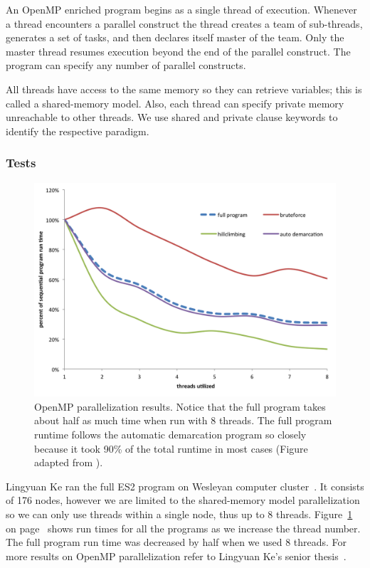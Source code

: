 An OpenMP enriched program begins as a single thread of execution.
Whenever a thread encounters a parallel construct the thread creates a team of sub-threads, generates a set of tasks, and then declares itself master of the team.
Only the master thread resumes execution beyond the end of the parallel construct.
The program can specify any number of parallel constructs.

All threads have access to the same memory so they can retrieve variables; this is called a shared-memory model.
Also, each thread can specify private memory unreachable to other threads.
We use shared and private clause keywords to identify the respective paradigm.

\subsubsection*{Tests}
\begin{figure}[h!]
\centering
\includegraphics[scale=0.6]{images/LingParallelized-CH4}
\caption[OpenMP parallelization results.]{OpenMP parallelization results. Notice that the full program takes about half as much time when run with 8 threads. The full program runtime follows the automatic demarcation program so closely because it took 90\% of the total runtime in most cases (Figure adapted from \protect\cite{lingThesis}).}
\label{fig:LingParallelized}
\end{figure}

Lingyuan Ke ran the full ES2 program on Wesleyan computer cluster~\cite{lingThesis}.
It consists of 176 nodes, however we are limited to the shared-memory model parallelization so we can only use threads within a single node, thus up to 8 threads.
Figure~\ref{fig:LingParallelized} on page~\pageref{fig:LingParallelized} shows run times for all the programs as we increase the thread number.
The full program run time was decreased by half when we used 8 threads.
For more results on OpenMP parallelization refer to Lingyuan Ke's senior thesis~\cite{lingThesis}.

